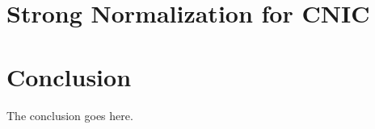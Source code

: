 \documentclass[conference]{IEEEtran}
\begin{document}
\section{Strong Normalization for CNIC}
\label{sec:cnic-sn}



\section{Conclusion}
\label{sec:conclusion}

The conclusion goes here.






\end{document}
